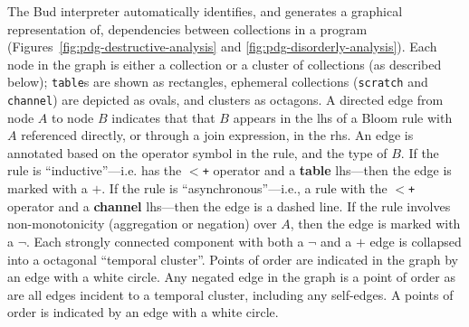 The Bud interpreter automatically identifies, and generates a graphical
representation of, dependencies between collections in a program
(Figures~\ref{fig:pdg-destructive-analysis} and \ref{fig:pdg-disorderly-analysis}).
Each node in the graph is either a collection or a cluster of collections (as
described below); \texttt{table}s are shown as rectangles, ephemeral
collections (\texttt{scratch} and \texttt{channel}) are depicted as ovals, and clusters as octagons.  A
directed edge from node $A$ to node $B$ indicates that that $B$ appears in the
lhs of a Bloom rule with $A$ referenced directly, or through a join expression,
in the rhs.  An edge is annotated based on the operator symbol in the rule, and
the type of $B$.  If the rule is ``inductive''---i.e. has the \texttt{$<$+}
operator and a {\bf table} lhs---then the edge is marked with a $+$.  If the
rule is ``asynchronous''---i.e., a rule with the \texttt{$<$+} operator and a {\bf
channel} lhs---then the edge is a dashed line.  If the rule involves
non-monotonicity (aggregation or negation) over $A$, then the edge is marked with a $\lnot$.
Each strongly connected component with both a $\lnot$ and a $+$ edge is collapsed
into a octagonal ``temporal cluster''.
Points of order are indicated in the graph by an edge with a white circle.
 Any negated edge in the graph is a point of order as are all edges incident to a temporal cluster, including any self-edges.
A points of order is indicated by an edge with a white circle.

